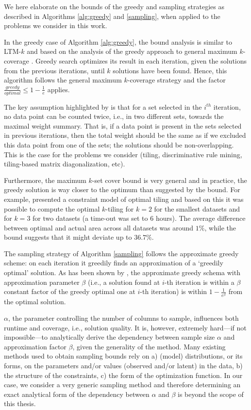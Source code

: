 We here elaborate on the bounds of the greedy and sampling strategies as described in Algorithms \ref{alg:greedy} and \ref{sampling}, when applied to the problems we consider in this work.

In the greedy case of Algorithm \ref{alg:greedy}, the bound analysis is similar to LTM-$k$ and based on the analysis of the greedy approach to general maximum $k$-coverage \parencite{max_k_set_cover1, max_k_set_cover2}. Greedy search optimizes its result in each iteration, given the solutions from the previous iterations, until $k$ solutions have been found. Hence, this algorithm follows the general maximum $k$-coverage strategy and the factor $\frac{\textit{greedy}}{\textit{optimal}} \leq 1-\frac{1}{e}$ applies.

The key assumption highlighted by \cite{max_k_set_cover1} is that for a set selected in the $i^{th}$ iteration, no data point can be counted twice, i.e., in two different sets, towards the maximal weight summary. That is, if a data point is present in the sets selected in previous iterations, then the total weight should be the same as if we excluded this data point from one of the sets; the solutions should be non-overlapping. This is the case for the problems we consider (tiling, discriminative rule mining, tiling-based matrix diagonalization, etc).

Furthermore, the maximum $k$-set cover bound is very general and in practice, the greedy solution is way closer to the optimum than suggested by the bound. For example, \cite{GunsNR13} presented a constraint model of optimal tiling and based on this it was possible to compute the optimal $k$-tiling for $k=2$ for the smallest datasets and for $k=3$ for two datasets (a time-out was set to 6 hours). The average difference between optimal and actual area across all datasets was around $1\%$, while the bound suggests that it might deviate up to $36.7\%$.

The sampling strategy of Algorithm \ref{sampling} follows the approximate greedy scheme: on each iteration it greedily finds an approximation of a `greedily optimal' solution. As has been shown by \cite{max_k_set_cover1}, the approximate greedy schema with approximation parameter $\beta$ (i.e., a solution found at $i$-th iteration is within a $\beta$ constant factor of the greedy optimal one at $i$-th iteration) is within $1-\frac{1}{e^\beta}$ from the optimal solution.

$\alpha$, the parameter controlling the number of columns to sample, influences both runtime and coverage, i.e., solution quality. It is, however, extremely hard---if not impossible---to analytically derive the dependency between sample size $\alpha$ and approximation factor $\beta$, given the generality of the method. Many existing methods used to obtain sampling bounds rely on a) (model) distributions, or its forms, on the parameters and/or values (observed and/or latent) in the data, b) the structure of the constraints, c) the form of the optimization function. In our case, we consider a very generic sampling method and therefore determining an exact analytical form of the dependency between $\alpha$ and $\beta$ is beyond the scope of this thesis.

